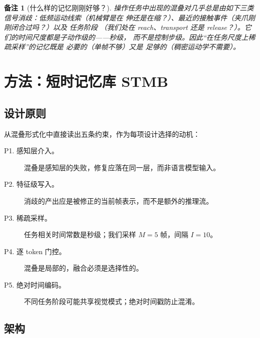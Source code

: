 \documentclass[11pt]{ctexart}
\newtheorem{remark}{备注}
\begin{document}
\begin{remark}[什么样的记忆刚刚好够？]
操作任务中出现的混叠对几乎总是由如下三类信号消歧：\emph{低频运动线索}（机械臂是在
伸还是在缩？）、\emph{最近的接触事件}（夹爪刚刚闭合过吗？）以及 \emph{任务阶段}
（我们处在 reach、transport 还是 release？）。它们的时间尺度都是子动作级的——秒级，
而不是控制步级。因此“在任务尺度上稀疏采样”的记忆既是 \emph{必要的}（单帧不够）又是
\emph{足够的}（稠密运动学不需要）。
\end{remark}

\section{方法：短时记忆库 STMB}
\label{sec:method}

\subsection{设计原则}
\label{sec:principles}

从混叠形式化中直接读出五条约束，作为每项设计选择的动机：
\begin{description}
    \item[P1. 感知层介入。] 混叠是感知层的失败，修复应落在同一层，而非语言模型输入。
    \item[P2. 特征级写入。] 消歧的产出应是被修正的当前帧表示，而不是额外的推理流。
    \item[P3. 稀疏采样。] 任务相关时间常数是秒级；我们采样 $M{=}5$ 帧，间隔 $I{=}10$。
    \item[P4. 逐 token 门控。] 混叠是局部的，融合必须是选择性的。
    \item[P5. 绝对时间编码。] 不同任务阶段可能共享视觉模式；绝对时间戳防止混淆。
\end{description}

\subsection{架构}
\label{sec:arch}
\end{document}
